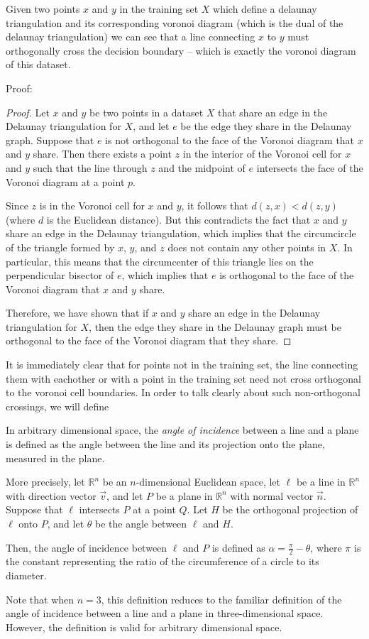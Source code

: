 Given two points $x$ and $y$ in the training set $X$ which define a delaunay
triangulation and its corresponding voronoi diagram (which is the dual
of the delaunay triangulation) we can see that a line connecting $x$ to
$y$ must orthogonally cross the decision boundary -- which is exactly the voronoi
diagram of this dataset.

Proof:
\begin{proof}
Let $x$ and $y$ be two points in a dataset $X$ that share an edge in the Delaunay triangulation for $X$, and let $e$ be the edge they share in the Delaunay graph. Suppose that $e$ is not orthogonal to the face of the Voronoi diagram that $x$ and $y$ share. Then there exists a point $z$ in the interior of the Voronoi cell for $x$ and $y$ such that the line through $z$ and the midpoint of $e$ intersects the face of the Voronoi diagram at a point $p$.

Since $z$ is in the Voronoi cell for $x$ and $y$, it follows that $d(z, x) < d(z, y)$ (where $d$ is the Euclidean distance). But this contradicts the fact that $x$ and $y$ share an edge in the Delaunay triangulation, which implies that the circumcircle of the triangle formed by $x$, $y$, and $z$ does not contain any other points in $X$. In particular, this means that the circumcenter of this triangle lies on the perpendicular bisector of $e$, which implies that $e$ is orthogonal to the face of the Voronoi diagram that $x$ and $y$ share.

Therefore, we have shown that if $x$ and $y$ share an edge in the Delaunay triangulation for $X$, then the edge they share in the Delaunay graph must be orthogonal to the face of the Voronoi diagram that they share.
\end{proof}
It is immediately clear that for points not in the training set,
the line connecting them with eachother or with a point in the
training set need not cross orthogonal to the voronoi cell
boundaries. In order to talk clearly about such non-orthogonal
crossings, we will define
\begin{definition}
In arbitrary dimensional space, the \emph{angle of incidence} between a line and a plane is defined as the angle between the line and its projection onto the plane, measured in the plane.

More precisely, let $\mathbb{R}^n$ be an $n$-dimensional Euclidean space, let $\ell$ be a line in $\mathbb{R}^n$ with direction vector $\vec{v}$, and let $P$ be a plane in $\mathbb{R}^n$ with normal vector $\vec{n}$. Suppose that $\ell$ intersects $P$ at a point $Q$. Let $H$ be the orthogonal projection of $\ell$ onto $P$, and let $\theta$ be the angle between $\ell$ and $H$.

Then, the angle of incidence between $\ell$ and $P$ is defined as $\alpha = \frac{\pi}{2} - \theta$, where $\pi$ is the constant representing the ratio of the circumference of a circle to its diameter.

Note that when $n=3$, this definition reduces to the familiar definition of the angle of incidence between a line and a plane in three-dimensional space. However, the definition is valid for arbitrary dimensional space.
\end{definition}

